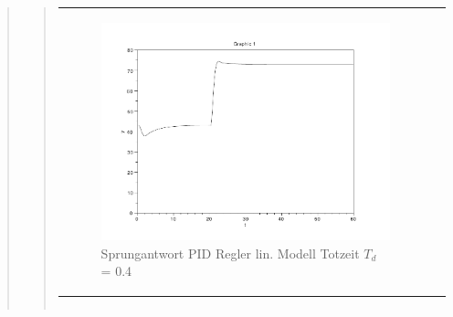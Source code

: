 \begin{quote}
\begin{quote}
\begin{center}
\begin{tabular}{ll}
                    \begin{minipage}{0.6\textwidth}
                        \begin{figure}[H]
                            \includegraphics[scale=0.4,trim = 0cm 0cm 0cm
                            0cm, clip]
                            {./Bilder/4_1_Td_04}
                              \caption{Sprungantwort PID Regler lin. Modell Totzeit $T_d$ = 0.4}
                        \end{figure}
                    \end{minipage}
                
                \end{tabular}
            \end{center}

            \begin{center}
                \begin{tabular}{ll}
                

\end{tabular}
\end{center}
\end{quote}
\end{quote}
